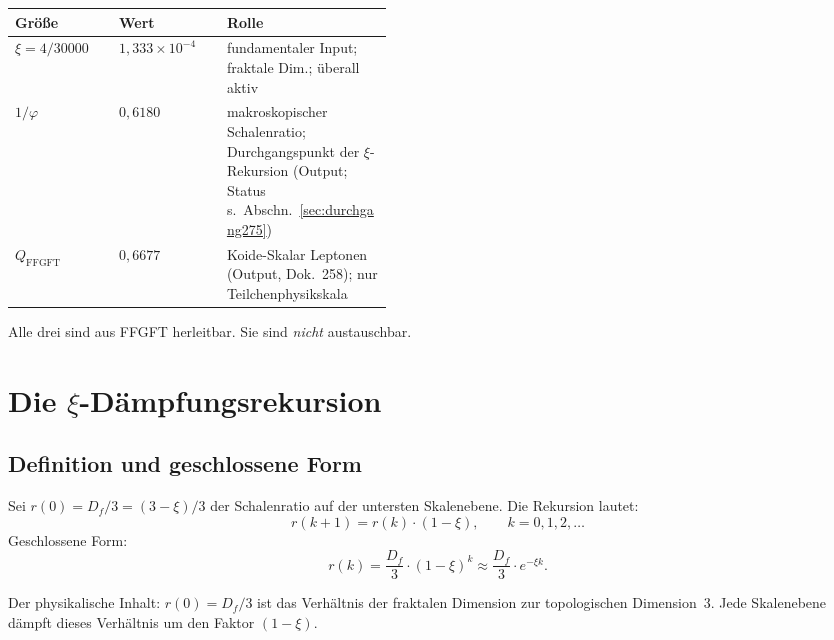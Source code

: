 \begin{definition}\label{def:skalare275}
\begin{center}
\begin{tabular}{@{}llp{0.44\linewidth}@{}}
\toprule
Größe & Wert & Rolle \\
\midrule
$\xi = 4/30000$ & $1{,}333\times10^{-4}$ &
  fundamentaler Input; fraktale Dim.; überall aktiv \\
$1/\varphi$ & $0{,}6180$ &
  makroskopischer Schalenratio; Durchgangspunkt der $\xi$-Rekursion (Output; Status s.\ Abschn.~\ref{sec:durchgang275}) \\
$Q_\mathrm{FFGFT}$ & $0{,}6677$ &
  Koide-Skalar Leptonen (Output, Dok.~258); nur Teilchenphysikskala \\
\bottomrule
\end{tabular}
\end{center}
Alle drei sind aus FFGFT herleitbar. Sie sind \emph{nicht} austauschbar.
\end{definition}

\section{Die $\xi$-Dämpfungsrekursion}

\subsection{Definition und geschlossene Form}

\begin{definition}[$\xi$-Dämpfungsrekursion]\label{def:rek275}
Sei $r(0) = D_f/3 = (3-\xi)/3$ der Schalenratio auf der untersten Skalenebene.
Die Rekursion lautet:
\begin{equation}
  r(k+1) = r(k)\cdot(1-\xi), \qquad k = 0,1,2,\ldots
  \label{eq:rek275}
\end{equation}
Geschlossene Form:
\begin{equation}
  r(k) = \frac{D_f}{3}\cdot(1-\xi)^k \approx \frac{D_f}{3}\cdot e^{-\xi k}.
  \label{eq:closed275}
\end{equation}
\end{definition}

Der physikalische Inhalt: $r(0) = D_f/3$ ist das Verhältnis der fraktalen
Dimension zur topologischen Dimension~3. Jede Skalenebene dämpft dieses
Verhältnis um den Faktor $(1-\xi)$.

